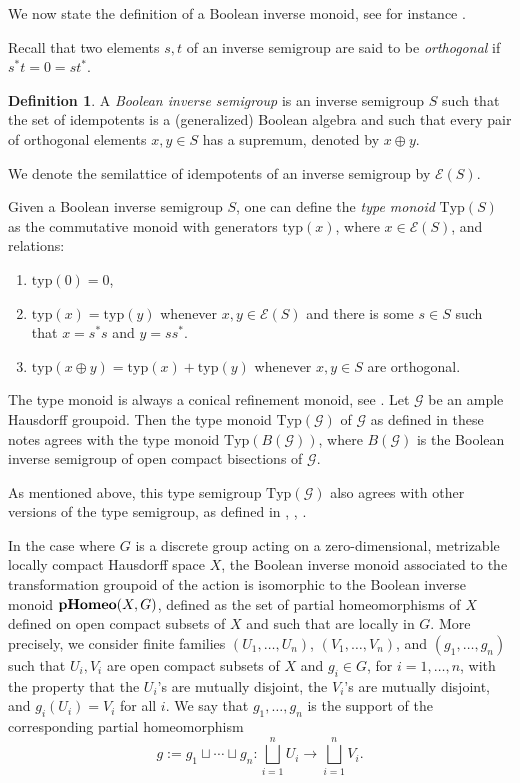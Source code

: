 \documentclass[11pt]{amsart}
\theoremstyle{plain}            %
\theoremstyle{definition}       %
\newtheorem{definition}[theorem]{Definition}
\theoremstyle{definition}       %
\theoremstyle{remark}
\newcommand{\Typ}{\mathrm{Typ}}
\newcommand{\typ}{\mathrm{typ}}
\newcommand{\pHomeo}{\mathrm{\bf pHomeo}}
\begin{document}
We now state the definition of a Boolean inverse monoid, see for instance \cite{weh}.

Recall that two elements $s,t$ of an inverse semigroup are said to be {\it orthogonal} if $s^*t= 0= st^*$. 

\begin{definition}
	\label{def:BIS}
	A {\it Boolean inverse semigroup} is an inverse semigroup $S$ such that the set of idempotents is a (generalized) Boolean algebra and such that every pair of orthogonal elements $x,y\in S$ has a supremum, denoted by $x\oplus y$. 
\end{definition}

We denote the semilattice of idempotents of an inverse semigroup by $\mathcal E (S)$. 

Given a Boolean inverse semigroup $S$, one can define the {\it type monoid} $\text{Typ} (S)$ as the commutative monoid with generators $\text{typ} (x)$, where $x\in \mathcal E (S)$, and relations:
\begin{enumerate}
	\item $\text{typ} (0) = 0$,
	\item $\typ (x) = \typ (y)$ whenever $x,y\in \mathcal E (S)$ and there is some $s\in S$ such that $x= s^*s$ and $y= ss^*$. 
	\item $\typ (x\oplus y) = \typ (x) + \typ (y) $ whenever $x,y\in S$ are orthogonal.  
\end{enumerate} 

The type monoid is always a conical refinement monoid, see \cite[Corollary 4-1.4]{weh}. 
Let $\mathcal G$ be an ample Hausdorff groupoid. Then the type monoid $\Typ (\mathcal G)$ of $\mathcal G$ as defined in these notes agrees with the type monoid $\Typ (B(\mathcal G))$, where $B(\mathcal G)$ is the Boolean inverse semigroup of open compact bisections of $\mathcal G$.  

As mentioned above, this type semigroup $\Typ (\mathcal G)$ also agrees with other versions of the type semigroup, as defined in \cite{bl20}, \cite{PSS}, \cite{RS}. 

In the case where $G$ is a discrete group acting on a zero-dimensional, metrizable locally compact Hausdorff space $X$, the Boolean inverse monoid associated to the transformation groupoid of the action
is isomorphic to the Boolean inverse monoid $\pHomeo (X,G)$, defined as the set of partial homeomorphisms of $X$ defined on open compact subsets of $X$ and such that are locally in $G$. More precisely, we consider finite families $(U_1,\dots ,U_n)$, $(V_1,\dots ,V_n)$, and $(g_1,\dots , g_n)$ such that $U_i,V_i$ are open compact subsets of $X$ and $g_i\in G$, for $i=1,\dots ,n$, with the property that the $U_i$'s are mutually disjoint, the $V_i$'s are mutually disjoint, and $g_i(U_i)= V_i$ for all $i$. We say that $g_1,\dots ,g_n$ is the support of the corresponding partial homeomorphism $$g:= g_1\sqcup \cdots \sqcup g_n\colon \bigsqcup_{i=1}^n U_i \to \bigsqcup_{i=1}^n V_i.$$ 
\end{document}
